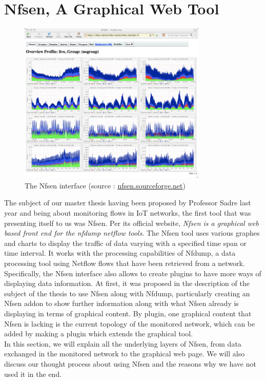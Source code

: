 \chapter{Nfsen, A Graphical Web Tool}

\begin{figure}[!h]
	\centering
	\includegraphics[width=0.8\textwidth]{res/nfsen.png}
	\caption{The Nfsen interface (source : \url{nfsen.sourceforge.net})}
	\label{fig:nfsen}
\end{figure}

The subject of our master thesis having been proposed by Professor Sadre last year and being about monitoring flows in IoT networks, the first tool that was presenting itself to us was Nfsen. Per its official website, \textit{Nfsen is a graphical web based front end for the nfdump netflow tools}. The Nfsen tool uses various graphes and charts to display the traffic of data varying with a specified time span or time interval. It works with the processing capabilities of Nfdump, a data processing tool using Netflow flows that have been retrieved from a network. Specifically, the Nfsen interface also allows to create plugins to have more ways of displaying data information. At first, it was proposed in the description of the subject of the thesis to use Nfsen along with Nfdump, particularly creating an Nfsen addon to show further information along with what Nfsen already is displaying in terms of graphical content. By plugin, one graphical content that Nfsen is lacking is the current topology of the monitored network, which can be added by making a plugin which extends the graphical tool.\\

In this section, we will explain all the underlying layers of Nfsen, from data exchanged in the monitored network to the graphical web page. We will also discuss our thought process about using Nfsen and the reasons why we have not used it in the end.\\

